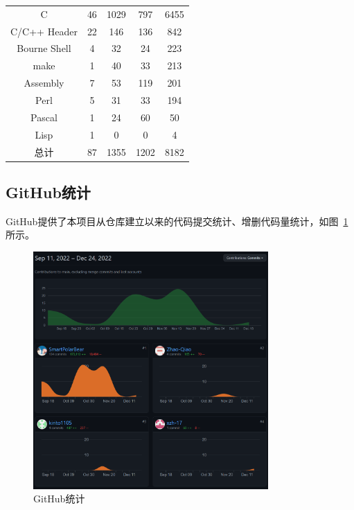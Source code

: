 \documentclass[a4paper,twoside]{ctexrep}
\begin{document}
\begin{spacing}{1.2}
\begin{table}[H]
\begin{tabular}{c|c|c|c|c}
		C                         &      46      &     1029    &        797  &         6455\\
		C/C++ Header              &      22      &      146    &        136  &          842\\
		Bourne Shell              &       4      &       32    &         24  &          223\\
		make                      &       1      &       40    &         33  &          213\\
		Assembly                  &       7      &       53    &        119  &          201\\
		Perl                      &       5      &       31    &         33  &          194\\
		Pascal                    &       1      &       24    &         60  &           50\\
		Lisp                      &       1      &        0    &          0  &            4\\
		\hline
		总计                      &      87       &    1355      &     1202   &        8182\\
		\hline
		\bottomrule
	\end{tabular}
\end{table}

\subsection{GitHub统计}

GitHub提供了本项目从仓库建立以来的代码提交统计、增删代码量统计，如图~\ref{fig:github}所示。
\begin{figure}[htb]
	\centering
	\includegraphics[width=0.8\textwidth]{gitstatistic.png}
	\caption{GitHub统计}
	\label{fig:github}
\end{figure}


\end{spacing}
\end{document}
